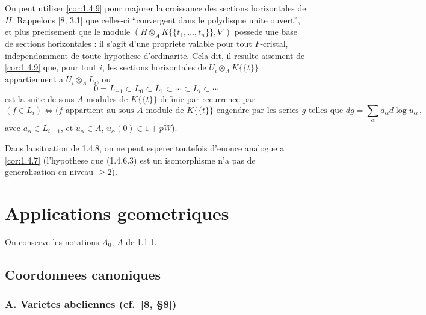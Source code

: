 \documentclass[12pt,a4paper]{article}
\theoremstyle{plain}
\theoremstyle{definition}
\theoremstyle{remark}
\begin{document}
On peut utiliser \ref{cor:1.4.9} pour majorer la croissance des sections horizontales de $H$. Rappelons [8, 3.1] que celles-ci ``convergent dans le polydisque unite ouvert'', et plus precisement que le module $(H \otimes_A K\{\{t_1, \ldots, t_n\}\}, \nabla)$ possede une base de sections horizontales : il s'agit d'une propriete valable pour tout $F$-cristal, independamment de toute hypothese d'ordinarite. Cela dit, il resulte aisement de \ref{cor:1.4.9} que, pour tout $i$, les sections horizontales de $U_i \otimes_A K\{\{t\}\}$ appartiennent a $U_i \otimes_A L_i$, ou
\[
0 = L_{-1} \subset L_0 \subset L_1 \subset \cdots \subset L_i \subset \cdots
\]
est la suite de sous-$A$-modules de $K\{\{t\}\}$ definie par recurrence par
\[
(f \in L_i) \Longleftrightarrow (f \text{ appartient au sous-$A$-module de } K\{\{t\}\} \text{ engendre par les series } g \text{ telles que } dg = \sum_\alpha a_\alpha d\log u_\alpha\,,
\]
avec $a_\alpha \in L_{i-1}$, et $u_\alpha \in A$, $u_\alpha(0) \in 1 + pW$).

Dans la situation de 1.4.8, on ne peut esperer toutefois d'enonce analogue a \ref{cor:1.4.7} (l'hypothese que (1.4.6.3) est un isomorphisme n'a pas de generalisation en niveau $\geq 2$).

\section{Applications geometriques}

On conserve les notations $A_0$, $A$ de 1.1.1.

\subsection{Coordonnees canoniques}

\subsubsection[A. Varietes abeliennes]{A. Varietes abeliennes ({cf.\ [8, \S 8]})}

\paragraph{}
\end{document}
